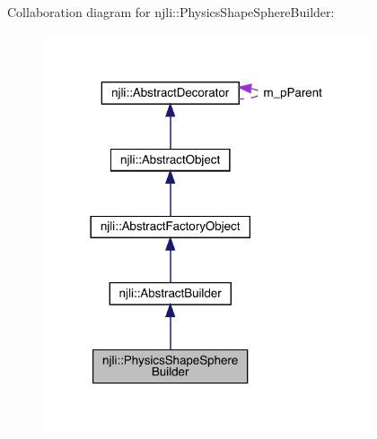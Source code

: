 Collaboration diagram for njli\+:\+:Physics\+Shape\+Sphere\+Builder\+:\nopagebreak
\begin{figure}[H]
\begin{center}
\leavevmode
\includegraphics[width=273pt]{classnjli_1_1_physics_shape_sphere_builder__coll__graph}
\end{center}
\end{figure}
